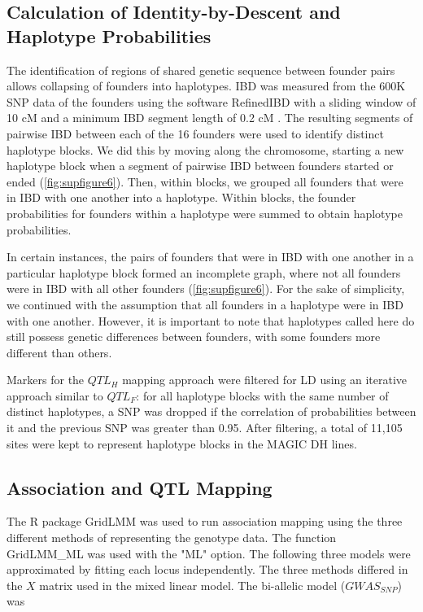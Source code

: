 \documentclass[article,9pt,twocolumn,twoside]{rilabRxiv}
\begin{document}
\subsection{Calculation of Identity-by-Descent and Haplotype Probabilities}
The identification of regions of shared genetic sequence between founder pairs allows collapsing of founders into haplotypes.
IBD was measured from the 600K SNP data of the founders using the software RefinedIBD with a sliding window of 10 cM and a minimum IBD segment length of 0.2 cM \citep{Browning}.
The resulting segments of pairwise IBD between each of the 16 founders were used to identify distinct haplotype blocks.
We did this by moving along the chromosome, starting a new haplotype block when a segment of pairwise IBD between founders started or ended (\ref{fig:supfigure6}).
Then, within blocks, we grouped all founders that were in IBD with one another into a haplotype.
Within blocks, the founder probabilities for founders within a haplotype were summed to obtain haplotype probabilities.

In certain instances, the pairs of founders that were in IBD with one another in a particular haplotype block formed an incomplete graph, where  not all founders were in IBD with all other founders (\ref{fig:supfigure6}).
For the sake of simplicity, we continued with the assumption that all founders in a haplotype were in IBD with one another.
However, it is important to note that haplotypes called here do still possess genetic differences between founders, with some founders more different than others.

Markers for the $QTL_H$ mapping approach were filtered for LD using an iterative approach similar to $QTL_F$: for all haplotype blocks with the same number of distinct haplotypes, a SNP was dropped if the correlation of probabilities between it and the previous SNP was greater than 0.95.
After filtering, a total of 11,105 sites were kept to represent haplotype blocks in the MAGIC DH lines.

\subsection{Association and QTL Mapping}
The R package GridLMM \citep{Runcie} was used to run association mapping using the three different methods of representing the genotype data.
The function GridLMM\_ML was used with the "ML" option.
The following three models were approximated by fitting each locus independently.
The three methods differed in the $X$ matrix used in the mixed linear model.
The bi-allelic model ($GWAS_{SNP}$) was
\end{document}

